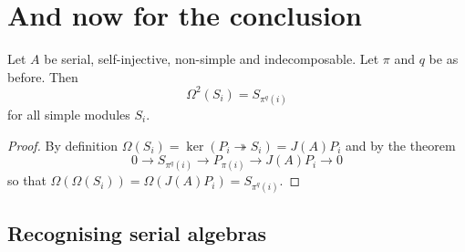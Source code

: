\documentclass[fontsize=11pt,fleqn,a4paper]{scrartcl}
\begin{document}
\section{And now for the conclusion}

\begin{corollary}[11.3.5]
Let $A$ be serial, self-injective, non-simple and indecomposable. Let $\pi$ and $q$ be as before. Then
\[\Omega^2(S_i) = S_{\pi^q(i)}\]
for all simple modules $S_i$.
\end{corollary}
\begin{proof}
By definition $\Omega(S_i) = \ker(P_i\twoheadrightarrow S_i) = J(A)P_i$ and by the theorem
\[0 \to S_{\pi^q(i)} \to P_{\pi(i)} \to J(A)P_i \to 0\]
so that $\Omega(\Omega(S_i)) = \Omega(J(A)P_i) = S_{\pi^q(i)}$.
\end{proof}

\subsection{Recognising serial algebras}
\end{document}
